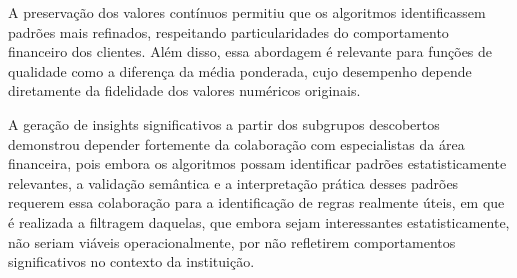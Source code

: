 \documentclass[12pt]{article}
\begin{document}
A preservação dos valores contínuos permitiu que os algoritmos identificassem padrões mais refinados, respeitando particularidades do comportamento financeiro dos clientes. Além disso, essa abordagem é relevante para funções de qualidade como a diferença da média ponderada, cujo desempenho depende diretamente da fidelidade dos valores numéricos originais.

A geração de insights significativos a partir dos subgrupos descobertos demonstrou depender fortemente da colaboração com especialistas da área financeira, pois embora os algoritmos possam identificar padrões estatisticamente relevantes, a validação semântica e a interpretação prática desses padrões requerem essa colaboração para a identificação de regras realmente úteis, em que é realizada a filtragem daquelas, que embora sejam interessantes estatisticamente, não seriam viáveis operacionalmente, por não refletirem comportamentos significativos no contexto da instituição.



\end{document}
